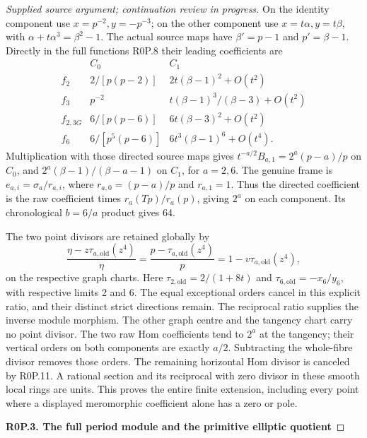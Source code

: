\begin{proof}[Supplied source argument; continuation review in progress]
On the identity component use \(x=p^{-2},y=-p^{-3}\); on the
other component use \(x=t\alpha,y=t\beta\), with
\(\alpha+t\alpha^3=\beta^2-1\). The actual source maps have
\(\beta'=p-1\) and \(p'=\beta-1\). Directly in the full
functions R0P.8 their leading coefficients are
\[
 \begin{array}{c|cc}
 & C_0&C_1\\\hline
 f_2&2/[p(p-2)]&2t(\beta-1)^2+O(t^2)\\
 f_3&p^{-2}&t(\beta-1)^3/(\beta-3)+O(t^2)\\
 f_{2,3G}&6/[p(p-6)]&6t(\beta-3)^2+O(t^2)\\
 f_6&6/[p^5(p-6)]&6t^3(\beta-1)^6+O(t^4).
 \end{array}
 \tag{R0P.10}
\]
Multiplication with those directed source maps gives
\(t^{-a/2}B_{a,1}=2^a(p-a)/p\) on \(C_0\), and
\(2^a(\beta-1)/(\beta-a-1)\) on \(C_1\), for \(a=2,6\).
The genuine frame is \(e_{a,i}=\sigma_a/r_{a,i}\), where
\(r_{a,0}=(p-a)/p\) and \(r_{a,1}=1\). Thus the directed
coefficient is the raw coefficient times
\(r_a(Tp)/r_a(p)\), giving \(2^a\) on each component. Its
chronological \(b=6/a\) product gives 64.

The two point divisors are retained globally by
\[
 \frac{\eta-z\tau_{a,\mathrm{old}}(z^4)}\eta
 =\frac{p-\tau_{a,\mathrm{old}}(z^4)}p
 =1-v\tau_{a,\mathrm{old}}(z^4),
 \tag{R0P.11}
\]
on the respective graph charts. Here
\(\tau_{2,\mathrm{old}}=2/(1+8t)\) and
\(\tau_{6,\mathrm{old}}=-x_6/y_6\), with respective limits
2 and 6. The equal exceptional orders cancel in this explicit
ratio, and their distinct strict directions remain. The reciprocal
ratio supplies the inverse module morphism. The other graph centre
and the tangency chart carry no point divisor. The two raw Hom
coefficients tend to \(2^a\) at the tangency; their vertical
orders on both components are exactly \(a/2\). Subtracting the
whole-fibre divisor removes those orders. The remaining horizontal
Hom divisor is canceled by R0P.11. A rational section and its
reciprocal with zero divisor in these smooth local rings are units.
This proves the entire finite extension, including every point
where a displayed meromorphic coefficient alone has a zero or pole.

\par

\medskip\noindent\textbf{R0P.3. The full period module and the primitive elliptic quotient}

\par\nobreak


\end{proof}
